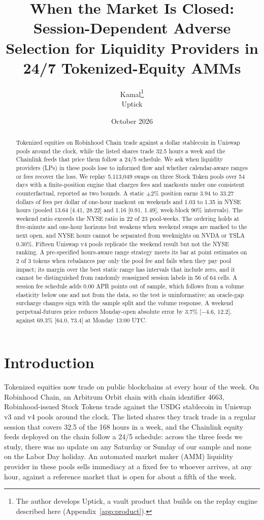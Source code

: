 \documentclass[11pt]{article}
\title{When the Market Is Closed: Session-Dependent Adverse Selection for Liquidity Providers in 24/7 Tokenized-Equity AMMs}
\author{Kamal\thanks{The author develops Uptick, a vault product that builds on the replay engine described here (Appendix~\ref{app:product}).}\\[2pt]\small Uptick}
\date{October 2026}
\begin{document}
\maketitle

\begin{abstract}
Tokenized equities on Robinhood Chain trade against a dollar stablecoin in Uniswap pools around the clock, while the listed shares trade 32.5 hours a week and the Chainlink feeds that price them follow a 24/5 schedule. We ask when liquidity providers (LPs) in these pools lose to informed flow and whether calendar-aware ranges or fees recover the loss. We replay 5,113,049 swaps on three Stock Token pools over 54 days with a finite-position engine that charges fees and markouts under one consistent counterfactual, reported as two bounds. A static $\pm2\%$ position earns 3.94 to 33.27 dollars of fees per dollar of one-hour markout on weekends and 1.03 to 1.35 in NYSE hours (pooled 13.64 [4.41, 28.22] and 1.16 [0.91, 1.49], week-block 90\% intervals). The weekend ratio exceeds the NYSE ratio in 22 of 23 pool-weeks. The ordering holds at five-minute and one-hour horizons but weakens when weekend swaps are marked to the next open, and NYSE hours cannot be separated from weeknights on NVDA or TSLA 0.30\%. Fifteen Uniswap v4 pools replicate the weekend result but not the NYSE ranking. A pre-specified hours-aware range strategy meets its bar at point estimates on 2 of 3 tokens when rebalances pay only the pool fee and fails when they pay pool impact; its margin over the best static range has intervals that include zero, and it cannot be distinguished from randomly reassigned session labels in 56 of 64 cells. A session fee schedule adds 0.00 APR points out of sample, which follows from a volume elasticity below one and not from the data, so the test is uninformative; an oracle-gap surcharge changes sign with the sample split and the volume response. A weekend perpetual-futures price reduces Monday-open absolute error by 3.7\% [$-$4.6, 12.2], against 69.3\% [64.0, 73.4] at Monday 13:00 UTC.
\end{abstract}

\section{Introduction}\label{sec:intro}

Tokenized equities now trade on public blockchains at every hour of the week. On Robinhood Chain, an Arbitrum Orbit chain with chain identifier 4663, Robinhood-issued Stock Tokens trade against the USDG stablecoin in Uniswap v3 and v4 pools around the clock. The listed shares they track trade in a regular session that covers 32.5 of the 168 hours in a week, and the Chainlink equity feeds deployed on the chain follow a 24/5 schedule: across the three feeds we study, there was no update on any Saturday or Sunday of our sample and none on the Labor Day holiday. An automated market maker (AMM) liquidity provider in these pools sells immediacy at a fixed fee to whoever arrives, at any hour, against a reference market that is open for about a fifth of the week.
\end{document}
